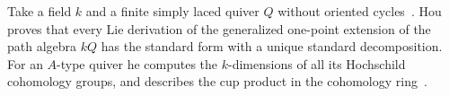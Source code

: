 Take a field $k$ and a finite simply laced quiver $Q$ without oriented
cycles~\cite{WlLieDerivationAndHochschildCoho2016}. Hou proves that every Lie derivation of the generalized one-point
extension of the path algebra $kQ$ has the standard form with a unique standard
decomposition. For an $A$-type quiver he computes the $k$-dimensions of all its
Hochschild cohomology groups, and describes the cup product in the cohomology
ring~\cite{WlLieDerivationAndHochschildCoho2016}.
